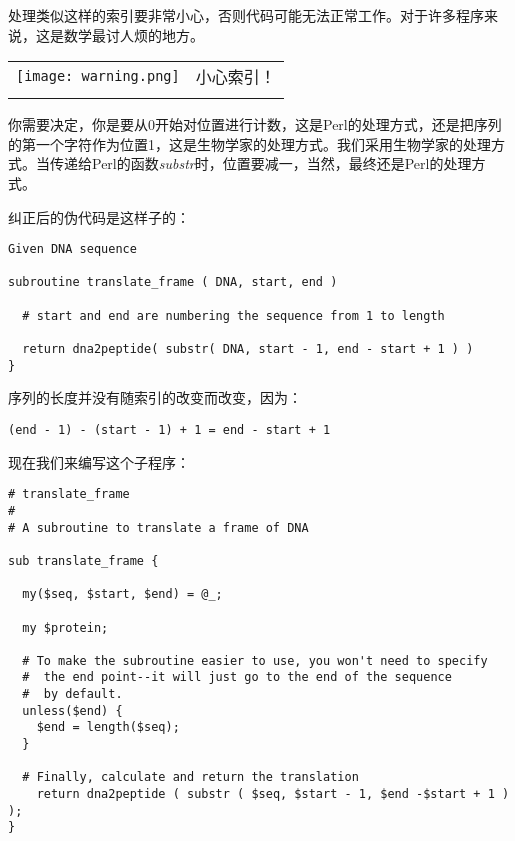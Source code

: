 处理类似这样的索引要非常小心，否则代码可能无法正常工作。对于许多程序来说，这是数学最讨人烦的地方。


\vspace{-5pt}
\begin{table}[h]
  \begin{center}
    \begin{tabu} to 0.85\linewidth {|X[1,r,m]X[15,l,m]|}
      \tabucline{-}
      \texttt{[image: warning.png]} & 小心索引！\\
      \tabucline{-}
    \end{tabu}
  \end{center}
\end{table}
\vspace{-20pt}

你需要决定，你是要从0开始对位置进行计数，这是Perl的处理方式，还是把序列的第一个字符作为位置1，这是生物学家的处理方式。我们采用生物学家的处理方式。当传递给Perl的函数\textit{substr}时，位置要减一，当然，最终还是Perl的处理方式。

纠正后的伪代码是这样子的：

\begin{lstlisting}
Given DNA sequence

subroutine translate_frame ( DNA, start, end )

  # start and end are numbering the sequence from 1 to length

  return dna2peptide( substr( DNA, start - 1, end - start + 1 ) )
}
\end{lstlisting}

序列的长度并没有随索引的改变而改变，因为：

\begin{lstlisting}
(end - 1) - (start - 1) + 1 = end - start + 1
\end{lstlisting}

现在我们来编写这个子程序：

\begin{lstlisting}
# translate_frame
#
# A subroutine to translate a frame of DNA

sub translate_frame {

  my($seq, $start, $end) = @_;

  my $protein;

  # To make the subroutine easier to use, you won't need to specify
  #  the end point--it will just go to the end of the sequence
  #  by default.
  unless($end) {
    $end = length($seq);
  }

  # Finally, calculate and return the translation
    return dna2peptide ( substr ( $seq, $start - 1, $end -$start + 1 ) );
}
\end{lstlisting}

